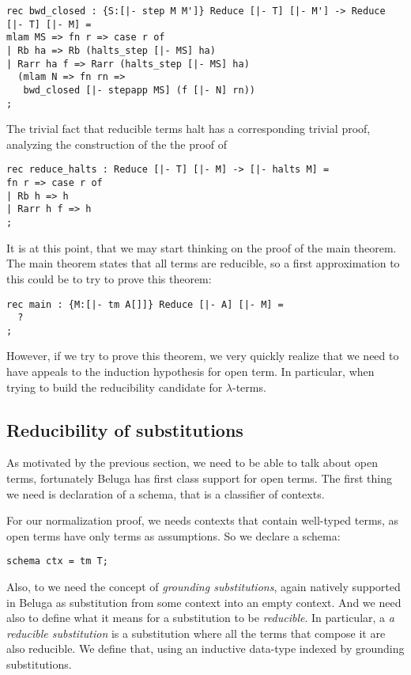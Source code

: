 \begin{lstlisting}
rec bwd_closed : {S:[|- step M M']} Reduce [|- T] [|- M'] -> Reduce [|- T] [|- M] =
mlam MS => fn r => case r of
| Rb ha => Rb (halts_step [|- MS] ha)
| Rarr ha f => Rarr (halts_step [|- MS] ha)
  (mlam N => fn rn =>
   bwd_closed [|- stepapp MS] (f [|- N] rn))
;
\end{lstlisting}

The trivial fact that reducible terms halt has a corresponding
trivial proof, analyzing the construction of the the proof of

\begin{lstlisting}
rec reduce_halts : Reduce [|- T] [|- M] -> [|- halts M] =
fn r => case r of
| Rb h => h
| Rarr h f => h
;
\end{lstlisting}

It is at this point, that we may start thinking on the proof of the
main theorem. The main theorem states that all terms are reducible, so
a first approximation to this could be to try to prove this theorem:

\begin{lstlisting}
rec main : {M:[|- tm A[]]} Reduce [|- A] [|- M] =
  ?
;
\end{lstlisting}

However, if we try to prove this theorem, we very quickly realize that
we need to have appeals to the induction hypothesis for open term. In
particular, when trying to build the reducibility candidate for
$\lambda$-terms.

\subsection{Reducibility of substitutions}

As motivated by the previous section, we need to be able to talk about
open terms, fortunately Beluga has first class support for open
terms. The first thing we need is declaration of a schema, that is a
classifier of contexts.

For our normalization proof, we needs contexts that contain well-typed
terms, as open terms have only terms as assumptions. So we declare a schema:
\begin{lstlisting}
schema ctx = tm T;
\end{lstlisting}

Also, to  we need the concept of \emph{grounding substitutions}, again
natively supported in Beluga as substitution from some context into an
empty context. And we need also to define what it means for a
substitution to be \emph{reducible}. In particular, a \emph{a
  reducible substitution} is a substitution where all the terms that
compose it are also reducible. We define that, using an inductive
data-type indexed by grounding substitutions.


